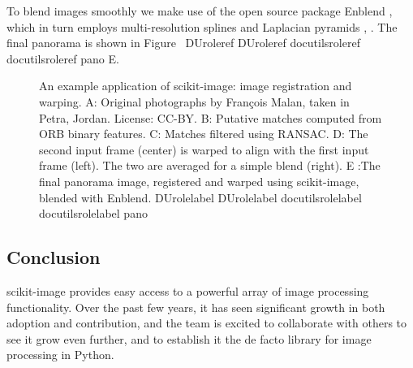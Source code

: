 \documentclass[letterpaper,compsoc,twoside]{IEEEtran}
\providecommand*{\DUrole}[2]{%
  \ifcsname DUrole#1\endcsname%
    \csname DUrole#1\endcsname{#2}%
  \else%
    \ifcsname docutilsrole#1\endcsname%
      \csname docutilsrole#1\endcsname{#2}%
    \else%
      #2%
    \fi%
  \fi%
}
\begin{document}
To blend images smoothly we make use of the open source package Enblend
\cite{Enblend}, which in turn employs multi-resolution splines and Laplacian
pyramids \cite{burt_adelson_0}, \cite{burt_adelson_1}.  The final panorama is shown in
Figure~\DUrole{ref}{pano} E.\begin{figure}[bht]\noindent{}
\caption{An example application of scikit-image: image registration and warping.
A: Original photographs by François Malan, taken in Petra, Jordan. License:
CC-BY.
B: Putative matches computed from ORB binary features.
C: Matches filtered using RANSAC.
D: The second input frame (center) is warped to align with the first input
frame (left). The two are averaged for a simple blend (right).
E :The final panorama image, registered and warped using scikit-image,
blended with Enblend.
\DUrole{label}{pano}}
\end{figure}

\subsection{Conclusion%
  \label{conclusion}%
}


scikit-image provides easy access to a powerful array of image processing
functionality.  Over the past few years, it has seen significant growth in both
adoption and contribution, and the team is excited to collaborate with others
to see it grow even further, and to establish it the de facto library for image
processing in Python.
\end{document}
